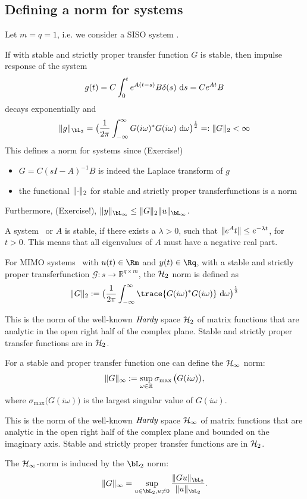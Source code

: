 \subsection{Defining a norm for systems}
Let $m=q=1$, i.e. we consider a SISO system \abcsys.

If \abcsys with stable and strictly proper transfer function $G$ is stable, then impulse response of the system
$$g(t) = C\int_0^t e^{A(t-s)}B\delta(s) \text{~\textup{d}} s = Ce^{At}B$$
decays exponentially and 
$$
\norm{g}_{\bL_2 } = \bigl( \frac{1}{2\pi} \int_{-\infty}^{\infty} G(i\omega)^*G(i\omega) \inva \omega \bigr)^{\frac 12} =: \norm{G}_2 < \infty
$$
This defines a norm for systems since (Exercise!)
\begin{itemize}
	\item $G=C(sI-A)^{-1}B$ is indeed the Laplace transform of $g$
	\item the functional $\lVert\cdot \rVert_2$ for stable and strictly proper transferfunctions is a norm
\end{itemize}

Furthermore, (Exercise!), $\norm{y}_{\bL_\infty} \leq \norm{G}_2 \norm{u}_{\bL_\infty}$.

\begin{footnotesize}
	A system \abcdsys~or $A$ is stable, if there exists a $\lambda>0$, such that $\lVert e^At \rVert\leq e^{-\lambda t}$, for $t>0$. This means that all eigenvalues of $A$ must have a negative real part.
\end{footnotesize}


For MIMO systems \abcsys~with $u(t)\in\Rm$ and $y(t)\in\Rq$, with a stable and strictly proper transferfunction $\mathcal G\colon s \to \mathbb R^{q\times m} $, the $\mathcal H_2$ norm is defined as  
\begin{equation*}
	\norm{G}_2 := \bigl( \frac{1}{2\pi} \int_{-\infty}^{\infty} \trace{ G(i\omega)^*G(i\omega)} \inva \omega \bigr)^{\frac 12}
\end{equation*}

This is the norm of the well-known $\emph{Hardy}$ space $\mathcal H_2$ of matrix functions that are analytic in the open right half of the complex plane. Stable and strictly proper transfer functions are in $\mathcal H_2$.

For a stable and proper transfer function one can define the $\mathcal H_\infty$ norm:
\begin{equation*}
	\lVert G \rVert_\infty := \sup_{\omega \in \mathbb R^{} } \sigma_{\max{}} \bigl(G(i\omega)\bigr),
\end{equation*}
where $\sigma_{\max{}}\bigl(G(i\omega)\bigr)$ is the largest singular value of $G(i\omega)$.

This is the norm of the well-known $\emph{Hardy}$ space $\mathcal H_\infty$ of matrix functions that are analytic in the open right half of the complex plane and bounded on the imaginary axis. Stable and strictly proper transfer functions are in $\mathcal H_2$.

The $\mathcal H_\infty$-norm is induced by the $\bL_2$ norm:
\begin{equation*}
	\norm{G}_\infty = \sup_{u\in \bL_2, u\neq 0}\frac{\norm{Gu}_{\bL_2}}{\norm{u}_{\bL_2}} .
\end{equation*}
